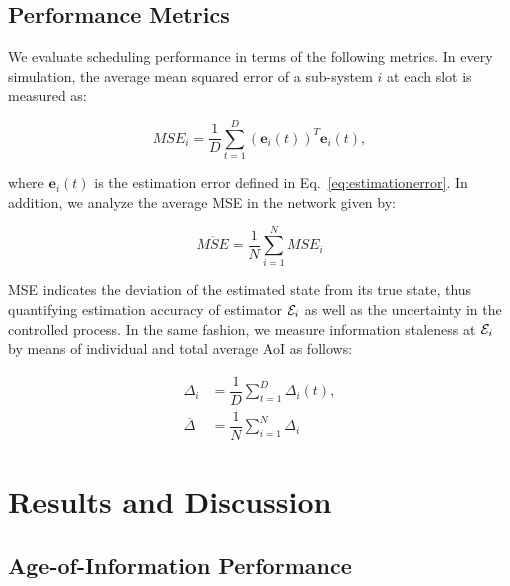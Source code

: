 \subsection{Performance Metrics} 

We evaluate scheduling performance in terms of the following metrics. In every
simulation, the average mean squared error of a sub-system $i$ at each slot is
measured as:

\begin{equation*}
  MSE_i = \dfrac{1}{D} \sum_{t=1}^{D}{(\boldsymbol{e}_i(t))^T \boldsymbol{e}_i(t)},
\end{equation*}

where $\boldsymbol{e}_i(t)$ is the estimation error defined in
Eq.~\eqref{eq:estimationerror}. In addition, we analyze the average MSE in the
network given by:

\begin{equation*}
  \overline{MSE} = \dfrac{1}{N} \sum_{i=1}^{N}{MSE_i}
\end{equation*}

MSE indicates the deviation of the estimated state from its true state, thus
quantifying estimation accuracy of estimator $\mathcal{E}_i$ as well as the
uncertainty in the controlled process. In the same fashion, we measure
information staleness at $\mathcal{E}_i$ by means of individual and total average
AoI as follows:

\begin{align*}
  \Delta_i &= \dfrac{1}{D} \sum_{t=1}^{D}{\Delta_i(t)}, \\
  \overline{\Delta} &= \dfrac{1}{N} \sum_{i=1}^{N}{\Delta_i}
\end{align*}

\section{Results and Discussion} \label{sec:results}

\subsection{Age-of-Information Performance}

